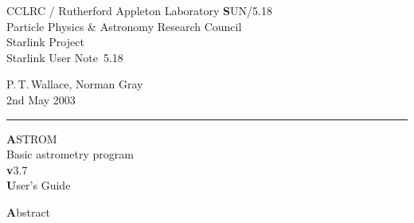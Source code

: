 \documentclass[twoside,11pt]{article}
\newcommand{\stardoccategory}  {Starlink User Note}
\newcommand{\stardocinitials}  {SUN}
\newcommand{\stardocnumber}    {5.18}
\newcommand{\stardocauthors}   {P.\,T.\,Wallace, Norman Gray}
\newcommand{\stardocdate}      {2nd May 2003}
\newcommand{\stardoctitle}     {ASTROM \\[2ex] Basic astrometry program}
\newcommand{\stardocversion}   {v3.7}
\newcommand{\stardocmanual}    {User's Guide}
\newcommand{\stardocname}{\stardocinitials /\stardocnumber}
\newenvironment{latexonly}{}{}
\renewcommand{\_}{\texttt{\symbol{95}}}
\begin{document}
\thispagestyle{empty}

\begin{latexonly}
   CCLRC / {\textsc Rutherford Appleton Laboratory} \hfill {\textbf \stardocname}\\
   {\large Particle Physics \& Astronomy Research Council}\\
   {\large Starlink Project\\}
   {\large \stardoccategory\ \stardocnumber}
   \begin{flushright}
   \stardocauthors\\
   \stardocdate
   \end{flushright}
   \vspace{-4mm}
   \rule{\textwidth}{0.5mm}
   \vspace{5mm}
   \begin{center}
   {\Huge\textbf  \stardoctitle \\ [2.5ex]}
   {\LARGE\textbf \stardocversion \\ [4ex]}
   {\Huge\textbf  \stardocmanual}
   \end{center}
   \vspace{5mm}


   \vspace{10mm}
   \begin{center}
      {\Large\textbf Abstract}
   \end{center}
\end{latexonly}
\end{document}
